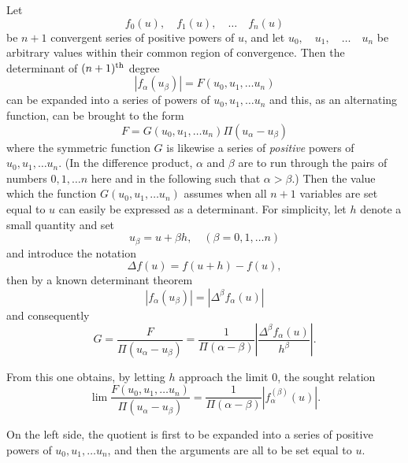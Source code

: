 \documentclass[12pt]{article}
\begin{document}
Let
\begin{equation*}
f_0(u),\quad f_1(u),\quad \dots \quad f_n(u)
\end{equation*}
be $n+1$ convergent series of positive powers of $u$, and let
$u_0,\quad u_1,\quad \dots \quad u_n$ be arbitrary values within their common region of convergence. Then the determinant of $(n+1)\textsuperscript{th}$ degree
\begin{equation*}
|f_\alpha(u_\beta)| = F(u_0, u_1, \dots u_n)
\end{equation*}
can be expanded into a series of powers of $u_0, u_1, \dots u_n$ and this, as an alternating function, can be brought to the form
\begin{equation*}
F = G(u_0, u_1, \dots u_n) \Pi(u_\alpha - u_\beta)
\end{equation*}
where the symmetric function $G$ is likewise a series of \textit{positive} powers of $u_0, u_1, \dots u_n$. 
(In the difference product, $\alpha$ and $\beta$ are to run through the pairs of numbers $0, 1, \dots n$ here and in the following such that $\alpha > \beta$.) Then the value which the function $G(u_0, u_1, \dots u_n)$ assumes when all
$n+1$ variables are set equal to $u$ can easily be expressed as a determinant. For simplicity, let $h$ denote a small quantity and set
\begin{equation*}
u_\beta = u + \beta h, \quad (\beta = 0, 1, \dots n)
\end{equation*}
and introduce the notation
\begin{equation*}
\Delta f(u) = f(u+h) - f(u),
\end{equation*}
then by a known determinant theorem
\begin{equation*}
|f_\alpha(u_\beta)| = |\Delta^\beta f_\alpha(u)|
\end{equation*}
and consequently
\begin{equation*}
G = \frac{F}{\Pi(u_\alpha - u_\beta)} = \frac{1}{\Pi(\alpha-\beta)} \left| \frac{\Delta^\beta f_\alpha(u)}{h^\beta} \right|.
\end{equation*}

From this one obtains, by letting $h$ approach the limit $0$, the sought relation
\begin{equation}
\lim \frac{F(u_0, u_1, \dots u_n)}{\Pi(u_\alpha-u_\beta)} = \frac{1}{\Pi(\alpha-\beta)} |f_\alpha^{(\beta)}(u)|.
\end{equation}

On the left side, the quotient is first to be expanded into a series of positive powers of $u_0, u_1, \dots u_n$, and then the arguments are all to be set equal to $u$.
\end{document}
